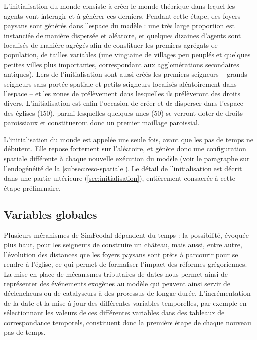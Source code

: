 L'initialisation du monde consiste à créer le monde théorique dans lequel les agents vont interagir et à générer ces derniers.
Pendant cette étape, des foyers paysans sont générés dans l'espace du modèle :  une très large proportion est instanciée de manière dispersée et aléatoire, et quelques dizaines d'agents sont localisés de manière agrégés afin de constituer les premiers agrégats de population, de tailles variables (une vingtaine de villages peu peuplés et quelques petites villes plus importantes, correspondant aux agglomérations secondaires antiques).
Lors de l'initialisation sont aussi créés les premiers seigneurs -- grands seigneurs sans portée spatiale et petits seigneurs localisés aléatoirement dans l'espace -- et les zones de prélèvement dans lesquelles ils prélèveront des droits divers.
L'initialisation est enfin l'occasion de créer et de disperser dans l'espace des églises (150), parmi lesquelles quelques-unes (50) se verront doter de droits paroissiaux et constitueront donc un premier maillage paroissial.

L'initialisation du monde est appelée une seule fois, avant que les pas de temps ne débutent. Elle repose fortement sur l'aléatoire, et génère donc une configuration spatiale différente à chaque nouvelle exécution du modèle (voir le paragraphe sur l'endogénéité de la \cref{subsec:reso-spatiale}).
Le détail de l'initialisation est décrit dans une partie ultérieure (\cref{sec:initialisation}), entièrement consacrée à cette étape préliminaire.

\subsection{Variables globales \label{meca-variables}}

Plusieurs mécanismes de SimFeodal dépendent du temps : la possibilité, évoquée plus haut, pour les seigneurs de construire un château, mais aussi, entre autre, l'évolution des distances que les foyers paysans sont prêts à parcourir pour se rendre à l'église, ce qui permet de formaliser l'impact des réformes grégoriennes.
La mise en place de mécanismes tributaires de dates nous permet ainsi de représenter des événements exogènes au modèle qui peuvent ainsi servir de déclencheurs ou de catalyseurs à des processus de longue durée.
L'incrémentation de la date et la mise à jour des différentes variables temporelles, par exemple en sélectionnant les valeurs de ces différentes variables dans des tableaux de correspondance temporels, constituent donc la première étape de chaque nouveau pas de temps.

